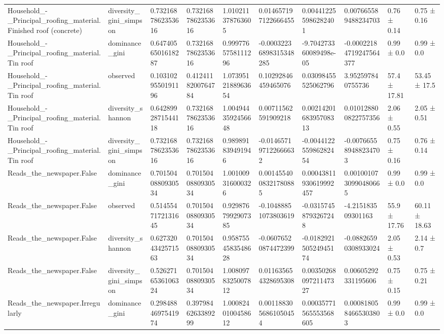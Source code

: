 \begin{longtable}{llllllllll}
Household\_-\_Principal\_roofing\_material.Finished roof (concrete) & diversity\_gini\_simpson & 0.7321687862353616 & 0.7321687862353616 & 1.010211378763605 & 0.014657197122666455 & 0.004412255986282401 & 0.007665589488234703 & 0.76 ± 0.14 & 0.75 ± 0.16 \\
Household\_-\_Principal\_roofing\_material.Tin roof & dominance\_gini & 0.6474056501618287 & 0.7321687862353616 & 0.9997765758111296 & -0.00032236898315348285 & -9.704273360089498e-05 & -0.00022184719247564377 & 0.99 ± 0.0 & 0.99 ± 0.0 \\
Household\_-\_Principal\_roofing\_material.Tin roof & observed & 0.1031029550191196 & 0.4124118200764784 & 1.0739512188963654 & 0.10292846459465076 & 0.03098455525062796 & 3.952597840755736 & 57.4 ± 17.81 & 53.45 ± 17.5 \\
Household\_-\_Principal\_roofing\_material.Tin roof & diversity\_shannon & 0.6428992871544118 & 0.7321687862353616 & 1.0049443592456648 & 0.00711562591909218 & 0.0021420168395708313 & 0.010128800822757356 & 2.06 ± 0.55 & 2.05 ± 0.51 \\
Household\_-\_Principal\_roofing\_material.Tin roof & diversity\_gini\_simpson & 0.7321687862353616 & 0.7321687862353616 & 0.989891839491946 & -0.014657197122666632 & -0.004412255986282454 & -0.007665589488234703 & 0.75 ± 0.16 & 0.76 ± 0.14 \\
Reads\_the\_newspaper.False & dominance\_gini & 0.7015040880930534 & 0.7015040880930534 & 1.001009316000326 & 0.0014554008321780885 & 0.00043811930619992457 & 0.0010010730990480665 & 0.99 ± 0.0 & 0.99 ± 0.0 \\
Reads\_the\_newspaper.False & observed & 0.5145547172131645 & 0.7015040880930534 & 0.9298767992907385 & -0.10488851073803619 & -0.03157458793267248 & -4.215183509301163 & 55.9 ± 17.76 & 60.11 ± 18.63 \\
Reads\_the\_newspaper.False & diversity\_shannon & 0.6273204342571563 & 0.7015040880930534 & 0.9587554583548628 & -0.06076520874472399 & -0.018292150524945174 & -0.08826590308933024 & 2.05 ± 0.53 & 2.14 ± 0.7 \\
Reads\_the\_newspaper.False & diversity\_gini\_simpson & 0.5262716536106324 & 0.7015040880930534 & 1.0080978325007812 & 0.011635654328695308 & 0.0035026809721147327 & 0.00605292331195606 & 0.75 ± 0.15 & 0.75 ± 0.21 \\
Reads\_the\_newspaper.Irregularly & dominance\_gini & 0.2984884697541974 & 0.3979846263389299 & 1.0008240100458612 & 0.0011883056861050454 & 0.00035771565553568605 & 0.0008180584665303803 & 0.99 ± 0.0 & 0.99 ± 0.0 \\

\end{longtable}
